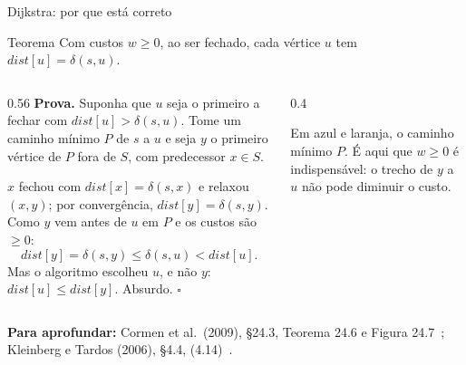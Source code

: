 \documentclass[aspectratio=169,xcolor=table]{beamer}
\newcommand{\fonte}[1]{%
  \vfill
  {\tiny\color{gray!55!black}\textbf{Para aprofundar:} #1\par}%
}
\begin{document}
\begin{frame}{Dijkstra: por que está correto}
  \begin{block}{Teorema}
    \small Com custos $w \ge 0$, ao ser fechado, cada vértice $u$ tem
    $\mathit{dist}[u] = \delta(s,u)$.
  \end{block}
  \begin{columns}[c]
    \begin{column}{0.56\textwidth}
      \scriptsize
      \textbf{Prova.} Suponha que $u$ seja o primeiro a fechar com
      $\mathit{dist}[u] > \delta(s,u)$. Tome um caminho mínimo $P$ de $s$ a $u$ e seja $y$ o
      primeiro vértice de $P$ fora de $S$, com predecessor $x \in S$.
      \smallskip

      $x$ fechou com $\mathit{dist}[x] = \delta(s,x)$ e relaxou $(x,y)$; por convergência,
      $\mathit{dist}[y] = \delta(s,y)$. Como $y$ vem antes de $u$ em $P$ e os custos são
      $\ge 0$:
      \[ \mathit{dist}[y] = \delta(s,y) \le \delta(s,u) < \mathit{dist}[u] . \]
      Mas o algoritmo escolheu $u$, e não $y$: $\mathit{dist}[u] \le \mathit{dist}[y]$.
      Absurdo. \hfill$\square$
    \end{column}
    \begin{column}{0.4\textwidth}
      \smallskip

      \tiny Em azul e laranja, o caminho mínimo $P$. É aqui que $w \ge 0$ é indispensável:
      o trecho de $y$ a $u$ não pode diminuir o custo.
    \end{column}
  \end{columns}
  \fonte{Cormen et al.\ (2009), \S 24.3, Teorema 24.6 e Figura 24.7~\cite{cormen2009introduction};
    Kleinberg e Tardos (2006), \S 4.4, (4.14)~\cite{kleinberg2006algorithm}.}
\end{frame}
\end{document}

